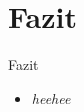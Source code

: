 \documentclass{beamer}
\begin{document}

\section{Fazit}
\begin{frame}{Fazit}
	\begin{itemize}
		\item{\emph{heehee}}
	\end{itemize}
\end{frame}

\end{document}
